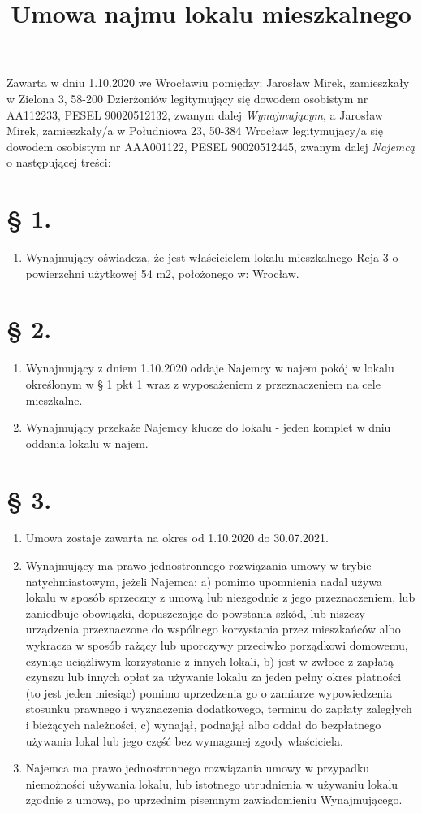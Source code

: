 \documentclass[a4paper,11pt, notitlepage]{article}
\title{Umowa najmu lokalu mieszkalnego}
\author{}
\date{}
\begin{document}
\maketitle
Zawarta w dniu 1.10.2020 we Wrocławiu pomiędzy:
Jarosław Mirek, zamieszkały w Zielona 3, 58-200 Dzierżoniów legitymujący się dowodem osobistym nr AA112233, PESEL 90020512132, zwanym dalej \textit{Wynajmującym}, a
Jarosław Mirek, zamieszkały/a w Południowa 23, 50-384 Wrocław legitymujący/a się dowodem osobistym nr AAA001122, PESEL 90020512445, zwanym dalej \textit{Najemcą} o następującej treści:
\section*{§ 1.}
    \begin{enumerate}
        \item Wynajmujący oświadcza, że jest właścicielem lokalu mieszkalnego Reja 3 o powierzchni użytkowej 54 m2, położonego w: Wrocław.
    \end{enumerate}
\section*{§ 2.}
    \begin{enumerate}
     \item Wynajmujący z dniem 1.10.2020 oddaje Najemcy w najem pokój w lokalu określonym w § 1 pkt 1 wraz z wyposażeniem z przeznaczeniem na cele mieszkalne.
    \item Wynajmujący przekaże Najemcy klucze do lokalu - jeden komplet w dniu oddania lokalu w najem.
    \end{enumerate}
\section*{§ 3.}
    \begin{enumerate}
     \item Umowa zostaje zawarta na okres od 1.10.2020 do 30.07.2021.
     \item Wynajmujący ma prawo jednostronnego rozwiązania umowy w trybie natychmiastowym, jeżeli Najemca:
        \subitem a) pomimo upomnienia nadal używa lokalu w sposób sprzeczny z umową lub niezgodnie z jego przeznaczeniem, lub zaniedbuje obowiązki, dopuszczając do powstania szkód, lub niszczy urządzenia	przeznaczone do wspólnego korzystania przez mieszkańców albo wykracza w sposób rażący lub uporczywy przeciwko porządkowi domowemu, czyniąc uciążliwym korzystanie z innych lokali,
        \subitem b) jest w zwłoce z zapłatą czynszu lub innych opłat za używanie lokalu za jeden pełny okres płatności (to jest jeden miesiąc) 	pomimo uprzedzenia go o zamiarze wypowiedzenia stosunku prawnego i wyznaczenia dodatkowego, terminu do zapłaty zaległych i bieżących należności,
        \subitem c) wynajął, podnajął albo oddał do bezpłatnego używania lokal lub jego część bez wymaganej zgody właściciela.
        \item Najemca ma prawo jednostronnego rozwiązania umowy w przypadku niemożności używania lokalu, lub istotnego utrudnienia w używaniu lokalu zgodnie z umową, po uprzednim pisemnym zawiadomieniu Wynajmującego.
    \end{enumerate}
\end{document}
